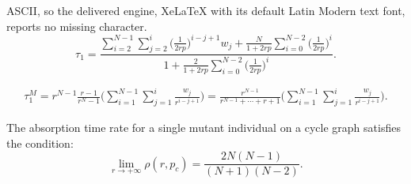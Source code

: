 \documentclass[10pt,a4paper]{amsart}
\begin{document}
ASCII, so the delivered engine, XeLaTeX with its default Latin Modern text font, reports no missing character.
\begin{equation} \label{eq:ATCycle}
 \tau_1 =  \frac{\displaystyle \sum_{i=2}^{N-1} \sum_{j=2}^i \big(\frac{1}{2rp}\big)^{i-j+1}w_j + \frac{N}{1+2rp} \sum_{i=0}^{N-2} \big(\frac{1}{2rp}\big)^i}{\displaystyle 1 + \frac{2}{1+2rp}  \sum_{i=0}^{N-2} \big(\frac{1}{2rp}\big)^i}.
\end{equation}

\begin{align} \label{eq:ATMorancycle}
 \tau_1^M  =  r^{N-1} \frac{\displaystyle r -1}{\displaystyle r^N - 1}  
\Big( \sum_{i=1}^{N-1} \sum_{j=1}^i \frac{w_j}{r^{i-j+1}} \Big)   = 
\frac{\displaystyle r^{N-1}}{r^{N-1} + \cdots + r + 1} \Big( \sum_{i=1}^{N-1} \sum_{j=1}^i \frac{w_j}{r^{i-j+1}} \Big). 
\end{align}

\begin{proposition} \label{prop:AR_cycle}
The absorption time rate for a single mutant individual on a cycle graph satisfies the condition:  
$$
\lim_{r \to +\infty} \rho(r,p_c)  = \frac{2N(N-1)}{(N+1)(N-2)}.
$$
\end{proposition}
\end{document}
